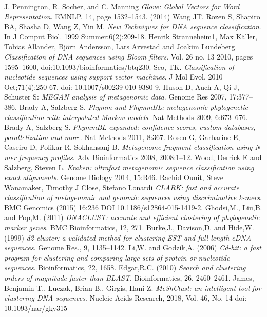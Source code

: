 \documentclass[oneside, twocolumn, a4paper, 10pt]{IEEEtran}
\begin{document}
\begin{thebibliography}{6}
 J. Pennington, R. Socher, and C. Manning \textit{Glove: Global Vectors for Word Representation}. EMNLP, 14, page 1532--1543. (2014)
 Wang JT, Rozen S, Shapiro BA, Shasha D, Wang Z, Yin M. \textit{New Techniques for DNA sequence classification}. In J Comput Biol. 1999 Summer;6(2):209-18.
 Henrik Stranneheim1, Max K\"{a}ller, Tobias Allander, Bj\"{o}rn Andersson, Lars Arvestad and Joakim Lundeberg. \textit{Classification of DNA sequences using Bloom filters}. Vol. 26 no. 13 2010, pages 1595–1600, doi:10.1093/bioinformatics/btq230.
 Seo, TK. \textit{Classification of nucleotide sequences using support vector machines}. J Mol Evol. 2010 Oct;71(4):250-67. doi: 10.1007/s00239-010-9380-9.
 Huson D, Auch A, Qi J, Schuster S: \textit{MEGAN analysis of metagenomic data}. Genome Res 2007, 17:377–386.
 Brady A, Salzberg S. \textit{Phymm and PhymmBL: metagenomic phylogenetic classification with interpolated Markov models}. Nat Methods 2009, 6:673–676.
 Brady A, Salzberg S. \textit{PhymmBL expanded: confidence scores, custom databases, parallelization and more}. Nat Methods 2011, 8:367.
 Rosen G, Garbarine E, Caseiro D, Polikar R, Sokhansanj B. \textit{Metagenome fragment classification using N-mer frequency profiles}. Adv Bioinformatics 2008, 2008:1–12.
 Wood, Derrick E and Salzberg, Steven L. \textit{Kraken: ultrafast metagenomic sequence classification using exact alignments}. Genome Biology 2014, 15:R46.
 Rachid Ounit, Steve Wanamaker, Timothy J Close, Stefano Lonardi \textit{CLARK: fast and accurate classification of metagenomic and genomic sequences using discriminative k-mers}. BMC Genomics (2015) 16:236 DOI 10.1186/s12864-015-1419-2.
 Ghodsi,M., Liu,B. and Pop,M. (2011) \textit{DNACLUST: accurate and efficient clustering of phylogenetic marker genes}. BMC Bioinformatics, 12, 271.
 Burke,J., Davison,D. and Hide,W. (1999) \textit{d2 cluster: a validated method for clustering EST and full-length cDNA sequences}. Genome Res., 9, 1135–1142.
 Li,W. and Godzik,A. (2006) \textit{Cd-hit: a fast program for clustering and comparing large sets of protein or nucleotide sequences}. Bioinformatics, 22, 1658.
 Edgar,R.C. (2010) \textit{Search and clustering orders of magnitude faster than BLAST}. Bioinformatics, 26, 2460–2461.
 James, Benjamin T., Luczak, Brian B., Girgis, Hani Z. \textit{MeShClust: an intelligent tool for clustering DNA sequences}. Nucleic Acids Research, 2018, Vol. 46, No. 14 doi: 10.1093/nar/gky315

\end{thebibliography}
\end{document}
